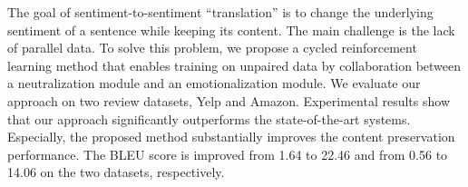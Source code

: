 The goal of sentiment-to-sentiment ``translation'' is to change the underlying sentiment of a sentence while keeping its content. The main challenge is the lack of parallel data. To solve this problem, we propose a cycled reinforcement learning method that enables training on unpaired data by collaboration between a neutralization module and an emotionalization module. We evaluate our approach on two review datasets, Yelp and Amazon. Experimental results show that our approach significantly outperforms the state-of-the-art systems. Especially, the proposed method substantially improves the content preservation performance. The BLEU score is improved from 1.64 to 22.46 and from 0.56 to 14.06 on the two datasets, respectively.
